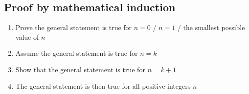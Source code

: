 \subsection{Proof by mathematical induction}
\begin{enumerate}
	\item Prove the general statement is true for $n=0$ / $n=1$ / the smallest possible value of $n$
	\item Assume the general statement is true for $n=k$
	\item Show that the general statement is true for $n=k+1$
	\item The general statement is then true for all positive integers $n$
\end{enumerate}